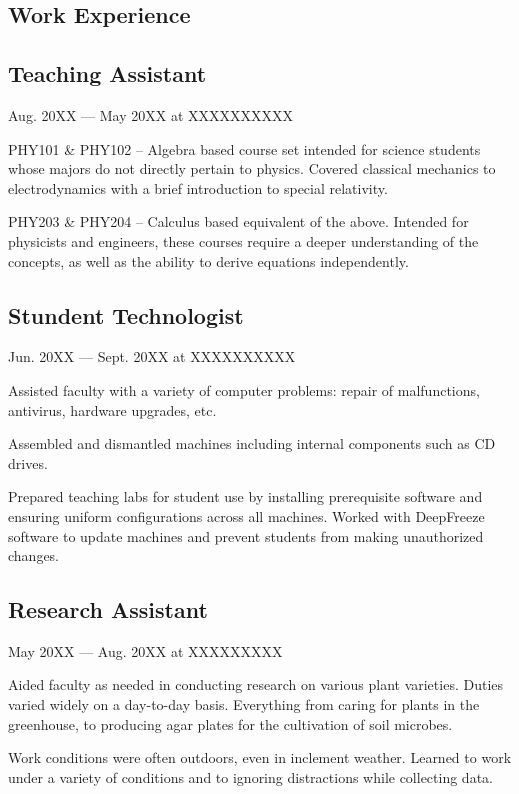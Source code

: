 \documentclass[letterpaper]{easyCV}
\begin{document}
\begin{main}
\section{Work Experience}

\subsection{Teaching Assistant}{Aug. 20XX --- May 20XX at XXXXXXXXXX}
\begin{mainlist}
\item PHY101 \& PHY102 -- Algebra based course set intended for science students whose majors do not directly pertain to physics.  Covered classical mechanics to electrodynamics with a brief introduction to special relativity.
\item PHY203 \& PHY204 -- Calculus based equivalent of the above.  Intended for physicists and engineers, these courses require a deeper understanding of the concepts, as well as the ability to derive equations independently.
\end{mainlist}

\subsection{Stundent Technologist}{Jun. 20XX --- Sept. 20XX at XXXXXXXXXX}
\begin{mainlist}
\item Assisted faculty with a variety of computer problems: repair of malfunctions, antivirus, hardware upgrades, etc. 
\item Assembled and dismantled machines including internal components such as CD drives.
\item Prepared teaching labs for student use by installing prerequisite software and ensuring uniform configurations across all machines.  Worked with DeepFreeze software to update machines and prevent students from making unauthorized changes.
\end{mainlist}

\subsection{Research Assistant}{May 20XX --- Aug. 20XX at XXXXXXXXX}
\begin{mainlist}
\item Aided faculty as needed in conducting research on various plant varieties.  Duties varied widely on a day-to-day basis.  Everything from caring for plants in the greenhouse, to producing agar plates for the cultivation of soil microbes.
\item Work conditions were often outdoors, even in inclement weather.  Learned to work under a variety of conditions and to ignoring distractions while collecting data.
\end{mainlist}


\end{main}
\end{document}
